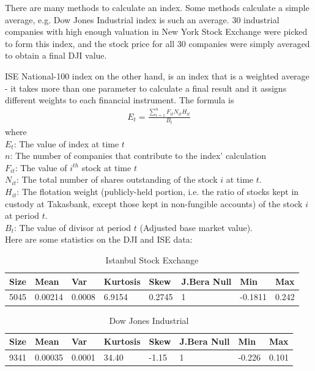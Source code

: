 There are many methods to calculate an index. Some methods calculate a simple
average, e.g. Dow Jones Industrial index is such an average. 30 industrial
companies with high enough valuation in New York Stock Exchange were picked to
form this index, and the stock price for all 30 companies were simply averaged
to obtain a final DJI value.

ISE National-100 index on the other hand, is an index that is a weighted average
- it takes more than one parameter to calculate a final result and it assigns
different weights to each financial instrument. The formula is
\begin{eqnarray*}
E_t = \frac{\sum_{i=1}^n F_{it} N_{it} H_{it}}{B_t}
\end{eqnarray*}
where\\
$E_t$: The value of index at time $t$\\
$n$: The number of companies that contribute to the index' calculation\\
$F_{it}$: The value of $i^{th}$ stock at time $t$\\
$N_{it}$: The total number of shares outstanding of the stock $i$ at time $t$. \\
$H_{it}$: The flotation weight (publicly-held portion, i.e. the ratio of stocks
kept in custody at Takasbank, except those kept in non-fungible accounts) of the
stock $i$ at period $t$. \\
$B_t$: The value of divisor at period $t$ (Adjusted base market value). \\

Here are some statistics on the DJI and ISE data:

\vspace{0.3cm}

\begin{table}[!h]
\caption{Istanbul Stock Exchange}
\vspace{0.3cm}
\begin{tabular}{|l|l|l|l|l|l|l|l|}
\hline
Size & Mean & Var & Kurtosis & Skew & J.Bera Null & Min & Max \\
\hline
5045 & 0.00214 & 0.0008 &     6.9154 &     0.2745 &  1 & -0.1811 & 0.242 \\
\hline
\end{tabular}
\end{table}

\vspace{0.3cm}

\begin{table}[!h]
\caption{Dow Jones Industrial}
\vspace{0.3cm}
\begin{tabular}{|l|l|l|l|l|l|l|l|}
\hline
Size & Mean & Var & Kurtosis & Skew & J.Bera Null & Min & Max \\
\hline
9341 & 0.00035 & 0.0001 &    34.40 &    -1.15 &     1 &    -0.226 & 0.101 \\
\hline
\end{tabular}
\end{table}


